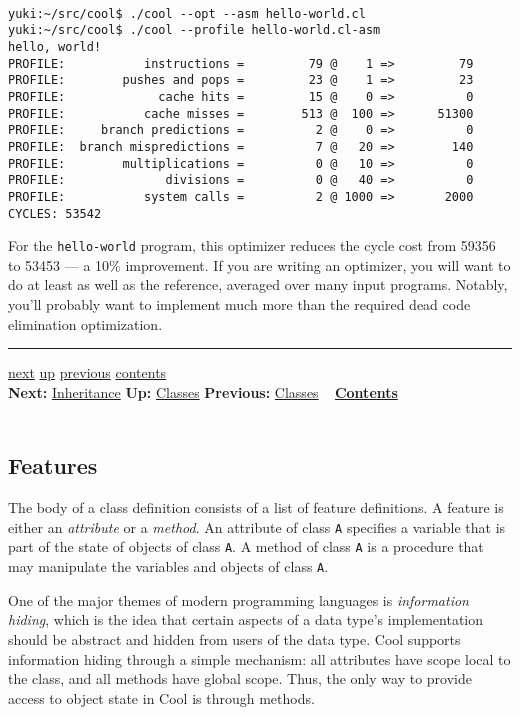 \documentclass[]{article}
\begin{document}
\begin{verbatim}
 
yuki:~/src/cool$ ./cool --opt --asm hello-world.cl
yuki:~/src/cool$ ./cool --profile hello-world.cl-asm 
hello, world!
PROFILE:           instructions =         79 @    1 =>         79
PROFILE:        pushes and pops =         23 @    1 =>         23
PROFILE:             cache hits =         15 @    0 =>          0
PROFILE:           cache misses =        513 @  100 =>      51300
PROFILE:     branch predictions =          2 @    0 =>          0
PROFILE:  branch mispredictions =          7 @   20 =>        140
PROFILE:        multiplications =          0 @   10 =>          0
PROFILE:              divisions =          0 @   40 =>          0
PROFILE:           system calls =          2 @ 1000 =>       2000
CYCLES: 53542
\end{verbatim}

For the \texttt{hello-world} program, this optimizer reduces the cycle
cost from 59356 to 53453 --- a 10\% improvement. If you are writing an
optimizer, you will want to do at least as well as the reference,
averaged over many input programs. Notably, you'll probably want to
implement much more than the required dead code elimination
optimization.

\begin{center}\rule{3in}{0.4pt}\end{center}

\href{node6.html}{next} \href{node4.html}{up}
\href{node4.html}{previous} \href{node1.html}{contents} \\
\textbf{Next:} \href{node6.html}{Inheritance} \textbf{Up:}
\href{node4.html}{Classes} \textbf{Previous:} \href{node4.html}{Classes}
~ \textbf{\href{node1.html}{Contents}} \\ \\

\subsection{Features}

The body of a class definition consists of a list of feature
definitions. A feature is either an \emph{attribute} or a \emph{method}.
An attribute of class \texttt{A} specifies a variable that is part of
the state of objects of class \texttt{A}. A method of class \texttt{A}
is a procedure that may manipulate the variables and objects of class
\texttt{A}.

One of the major themes of modern programming languages is
\emph{information hiding}, which is the idea that certain aspects of a
data type's implementation should be abstract and hidden from users of
the data type. Cool supports information hiding through a simple
mechanism: all attributes have scope local to the class, and all methods
have global scope. Thus, the only way to provide access to object state
in Cool is through methods.
\end{document}
